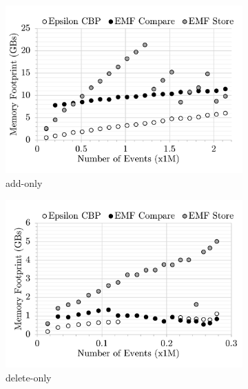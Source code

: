 \begin{figure}[ht]
    \centering
    \begin{subfigure}[t]{0.245\linewidth}
        \includegraphics[width=\linewidth]{add-conflict-memory-events}
        \caption{add-only}
        \label{fig:add-conflict-memory-events}
    \end{subfigure}
    \hfill
    \begin{subfigure}[t]{0.245\linewidth}
        \includegraphics[width=\linewidth]{delete-conflict-memory-events}
        \caption{delete-only}
        \label{fig:delete-conflict-memory-events}
    \end{subfigure}
    \hfill
    \begin{subfigure}[t]{0.245\linewidth}

\end{subfigure}
\end{figure}
